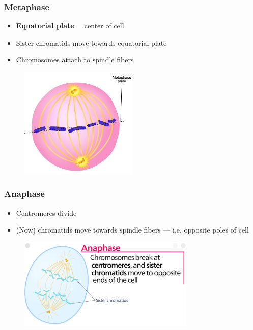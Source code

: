 \documentclass[a4paper,12pt]{article}
\begin{document}
\subsubsection{Metaphase}
\begin{itemize}
    \item{\textbf{Equatorial plate} = center of cell}
    \item{Sister chromatids move towards equatorial plate}
    \item{Chromosomes attach to spindle fibers}
\end{itemize}

\begin{figure}[H]
    \centering
    \includegraphics[width=0.5\textwidth]{metaphase}
\end{figure}

\pagebreak

\subsubsection{Anaphase}
\begin{itemize}
    \item{Centromeres divide}
    \item{(Now) chromatids move towards spindle fibers --- i.e. opposite poles of cell}
\end{itemize}

\begin{figure}[H]
    \centering
    \includegraphics[width=0.75\textwidth]{anaphase}
\end{figure}
\end{document}
